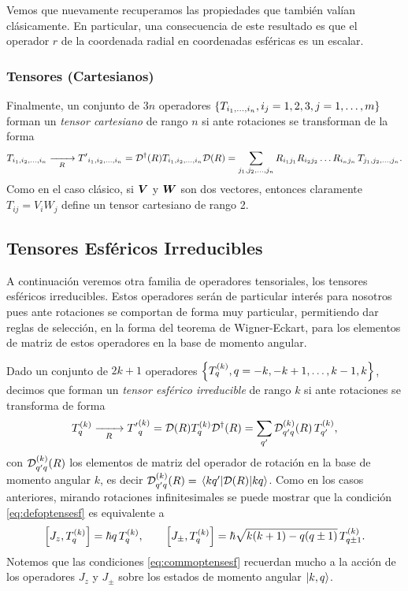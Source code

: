 \documentclass[10pt, a4paper]{article}
\newcommand{\jpmprefactev}[2]{\hbar\sqrt{{#1} - {#2}}}
\numberwithin{equation}{subsection}
\begin{document}
Vemos que nuevamente recuperamos las propiedades que también valían
clásicamente. En particular, una consecuencia de este resultado es que el
operador $r$ de la coordenada radial en coordenadas esféricas es un escalar.

\subsubsection{Tensores (Cartesianos)}
Finalmente, un conjunto de $3n$ operadores $\set{T_{i_1,\dots,i_n}, i_j=1,2,3,
j=1,\dots,m}$ forman un \emph{tensor cartesiano} de rango $n$ si ante
rotaciones se transforman de la forma
\begin{equation} \label{eq:defoptenscart}
  T_{i_1,i_2,\dots,i_n} \xrightarrow[R]{\qquad}
    {T'}_{i_1,i_2,\dots,i_n} = \RotationOp^\dagger(R) T_{i_1,i_2,\dots,i_n}
    \RotationOp(R) = \sum_{j_1,j_2,\dots,j_n}
    R_{i_1j_1}R_{i_2j_2}\dots R_{i_nj_n}\,T_{j_1,j_2,\dots,j_n}.
\end{equation}
Como en el caso clásico, si $\vb*{V}$ y $\vb*{W}$ son dos vectores, entonces
claramente $T_{ij} = V_iW_j$ define un tensor cartesiano de rango 2.

\subsection{Tensores Esféricos Irreducibles}
A continuación veremos otra familia de operadores tensoriales, los tensores
esféricos irreducibles. Estos operadores serán de particular interés para
nosotros pues ante rotaciones se comportan de forma muy particular, permitiendo
dar reglas de selección, en la forma del teorema de Wigner-Eckart,  para los
elementos de matriz de estos operadores en la base de momento angular.

Dado un conjunto de $2k+1$ operadores $\set{T^{(k)}_{q}, q =
-k,-k+1,\dots,k-1,k}$, decimos que forman un \emph{tensor esférico irreducible}
de rango $k$ si ante rotaciones se transforma de forma
\begin{equation} \label{eq:defoptensesf}
  T^{(k)}_{q} \xrightarrow[R]{\qquad}
    {T'}^{(k)}_{q} = \RotationOp(R) T^{(k)}_{q}
    \RotationOp^\dagger(R) = \sum_{q'}
    \RotationOp^{(k)}_{q'q}(R)\,T^{(k)}_{q'},
\end{equation}
con $\RotationOp^{(k)}_{q'q}(R)$ los elementos de matriz del operador de
rotación en la base de momento angular $k$, es decir
$\RotationOp^{(k)}_{q'q}(R) = \matrixel{kq'}{\RotationOp(R)}{kq}$.
Como en los casos anteriores, mirando rotaciones infinitesimales se puede
mostrar que la condición \eqref{eq:defoptensesf} es equivalente a
\begin{equation} \label{eq:commoptensesf}
  \comm{J_z}{T^{(k)}_{q}} = \hbar q\,T^{(k)}_{q}, \qquad
  \comm{J_{\pm}}{T^{(k)}_{q}} = \jpmprefactev{k(k+1)}{q(q\pm1)}\,
    T^{(k)}_{q\pm1}.
\end{equation}
Notemos que las condiciones \eqref{eq:commoptensesf} recuerdan mucho a la
acción de los operadores $J_z$ y $J_\pm$ sobre los estados de momento angular
$\ket{k,q}$.
\end{document}
